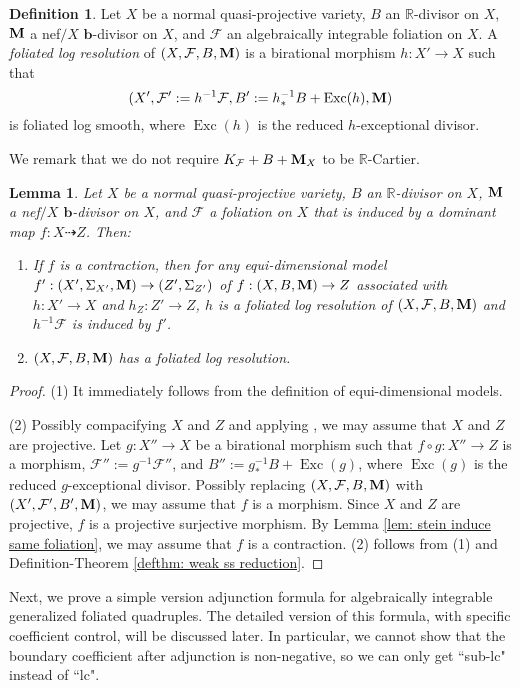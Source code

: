 \documentclass[11pt]{amsart}
\numberwithin{equation}{section}
\newcommand{\bb}{\bm{b}}
\newcommand{\Mm}{{\bf{M}}}
\newcommand{\Rr}{\mathbb{R}}
\newcommand{\Exc}{\operatorname{Exc}}
\newcommand{\Ff}{\mathcal{F}}
\newtheorem{lem}[thm]{Lemma}
\theoremstyle{definition}
\newtheorem{defn}[thm]{Definition}
\theoremstyle{definition}
\theoremstyle{definition}
\begin{document}
\begin{defn}\label{defn: log resolution}
Let $X$ be a normal quasi-projective variety, $B$ an $\Rr$-divisor on $X$, $\Mm$ a nef$/X$ $\bb$-divisor on $X$, and $\Ff$ an algebraically integrable foliation on $X$. A \emph{foliated log resolution} of $(X,\Ff,B,\Mm)$ is a birational morphism $h: X'\rightarrow X$ such that 
$$(X',\Ff':=h^{-1}\Ff,B':=h^{-1}_*B+\Exc(h),\Mm)$$ 
is foliated log smooth, where $\Exc(h)$ is the reduced $h$-exceptional divisor. 

We remark that we do not require $K_{\Ff}+B+\Mm_X$ to be $\Rr$-Cartier.
\end{defn}

\begin{lem}\label{lem: existence foliated log resolution}
Let $X$ be a normal quasi-projective variety, $B$ an $\Rr$-divisor on $X$, $\Mm$ a nef$/X$ $\bb$-divisor on $X$, and $\Ff$ a foliation on $X$ that is induced by a dominant map $f: X\dashrightarrow Z$. Then:
\begin{enumerate}
    \item If $f$ is a contraction, then for any equi-dimensional model $f': (X',\Sigma_{X'},\Mm)\rightarrow (Z',\Sigma_{Z'})$ of $f: (X,B,\Mm)\rightarrow Z$ associated with $h: X'\rightarrow X$ and $h_Z: Z'\rightarrow Z$, $h$ is a foliated log resolution of $(X,\Ff,B,\Mm)$ and $h^{-1}\Ff$ is induced by $f'$.
    \item $(X,\Ff,B,\Mm)$ has a foliated log resolution.
\end{enumerate}
\end{lem}
\begin{proof}
(1) It immediately follows from the definition of equi-dimensional models.

(2) Possibly compacifying $X$ and $Z$ and applying \cite[Lemma 2.2]{CS23b}, we may assume that $X$ and $Z$ are projective. Let $g: X''\rightarrow X$ be a birational morphism such that $f\circ g: X''\rightarrow Z$ is a morphism, $\Ff'':=g^{-1}\Ff''$, and $B'':=g^{-1}_*B+\Exc(g)$, where  $\Exc(g)$ is the reduced $g$-exceptional divisor. Possibly replacing $(X,\Ff,B,\Mm)$ with $(X',\Ff',B',\Mm)$, we may assume that $f$ is a morphism. Since $X$ and $Z$ are projective, $f$ is a projective surjective morphism. By Lemma \ref{lem: stein induce same foliation}, we may assume that $f$ is a contraction. (2) follows from (1) and Definition-Theorem \ref{defthm: weak ss reduction}.
\end{proof}

Next, we prove a simple version adjunction formula for algebraically integrable generalized foliated quadruples. The detailed version of this formula, with specific coefficient control, will be discussed later. In particular, we cannot show that the boundary coefficient after adjunction is non-negative, so we can only get ``sub-lc" instead of ``lc".
\end{document}

